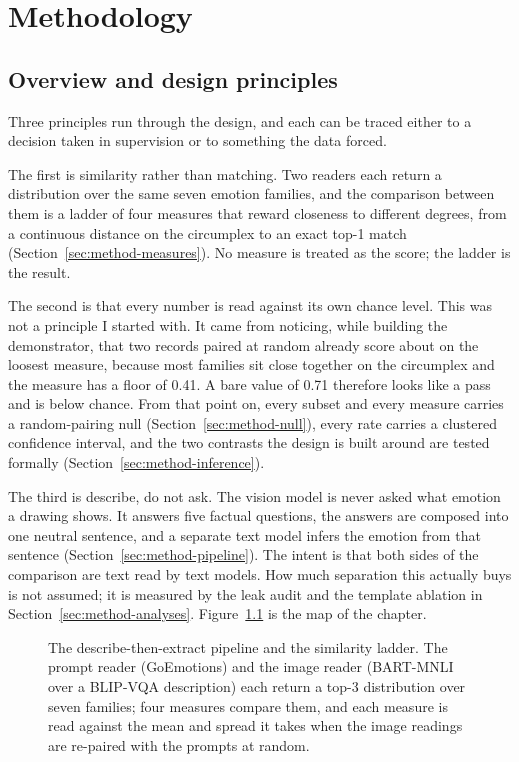 \chapter{Methodology}
\label{ch:method}

\section{Overview and design principles}
\label{sec:method-overview}

Three principles run through the design, and each can be traced either to a decision taken in supervision or to something the data forced.

The first is similarity rather than matching. Two readers each return a distribution over the same seven emotion families, and the comparison between them is a ladder of four measures that reward closeness to different degrees, from a continuous distance on the circumplex to an exact top-1 match (Section~\ref{sec:method-measures}). No measure is treated as the score; the ladder is the result.

The second is that every number is read against its own chance level. This was not a principle I started with. It came from noticing, while building the demonstrator, that two records paired at random already score about \FullNeuVaNull{} on the loosest measure, because most families sit close together on the circumplex and the measure has a floor of 0.41. A bare value of 0.71 therefore looks like a pass and is below chance. From that point on, every subset and every measure carries a random-pairing null (Section~\ref{sec:method-null}), every rate carries a clustered confidence interval, and the two contrasts the design is built around are tested formally (Section~\ref{sec:method-inference}).

The third is describe, do not ask. The vision model is never asked what emotion a drawing shows. It answers five factual questions, the answers are composed into one neutral sentence, and a separate text model infers the emotion from that sentence (Section~\ref{sec:method-pipeline}). The intent is that both sides of the comparison are text read by text models. How much separation this actually buys is not assumed; it is measured by the leak audit and the template ablation in Section~\ref{sec:method-analyses}. Figure~\ref{fig:pipeline} is the map of the chapter.

\begin{figure}[htbp]
\centering
\resizebox{\textwidth}{!}{}
\caption{The describe-then-extract pipeline and the similarity ladder. The prompt reader (GoEmotions) and the image reader (BART-MNLI over a BLIP-VQA description) each return a top-3 distribution over seven families; four measures compare them, and each measure is read against the mean and spread it takes when the image readings are re-paired with the prompts at random.}
\label{fig:pipeline}
\end{figure}

